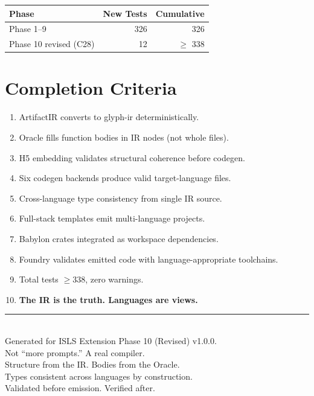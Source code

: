 \documentclass[11pt,a4paper,twoside]{article}
\theoremstyle{definition}
\theoremstyle{plain}
\theoremstyle{remark}
\newcommand{\ISLS}{\textsf{ISLS}}
\begin{document}
\begin{tabular}{l r r}
\toprule
\textbf{Phase} & \textbf{New Tests} & \textbf{Cumulative} \\
\midrule
Phase 1--9 & 326 & 326 \\
Phase 10 revised (C28) & 12 & $\ge$ 338 \\
\bottomrule
\end{tabular}

\section{Completion Criteria}

\begin{enumerate}[nosep]
  \item ArtifactIR converts to glyph-ir deterministically.
  \item Oracle fills function bodies in IR nodes (not whole files).
  \item H5 embedding validates structural coherence before codegen.
  \item Six codegen backends produce valid target-language files.
  \item Cross-language type consistency from single IR source.
  \item Full-stack templates emit multi-language projects.
  \item Babylon crates integrated as workspace dependencies.
  \item Foundry validates emitted code with language-appropriate
        toolchains.
  \item Total tests $\ge 338$, zero warnings.
  \item \textbf{The IR is the truth. Languages are views.}
\end{enumerate}

\vfill
\begin{center}
\rule{0.5\textwidth}{0.4pt}\\[0.5cm]
{\small Generated for \ISLS{} Extension Phase 10 (Revised) v1.0.0.\\
Not ``more prompts.'' A real compiler.\\
Structure from the IR. Bodies from the Oracle.\\
Types consistent across languages by construction.\\
Validated before emission. Verified after.}
\end{center}
\end{document}
